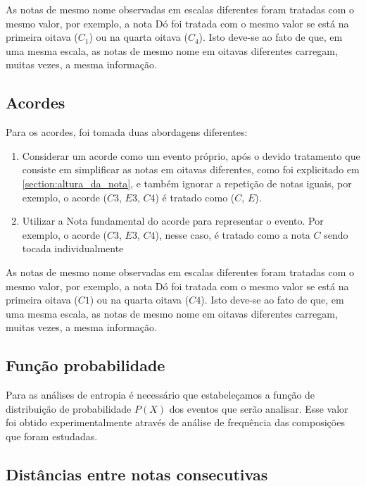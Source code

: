 As notas de mesmo nome observadas em escalas diferentes foram tratadas com o mesmo valor, por exemplo, a nota Dó foi tratada com o mesmo valor se está na primeira oitava ($C_1$) ou na quarta oitava ($C_4$). Isto deve-se ao fato de que, em uma mesma escala, as notas de mesmo nome em oitavas diferentes carregam, muitas vezes, a mesma informação.

\subsection{Acordes}

Para os acordes, foi tomada duas abordagens diferentes:

\begin{enumerate}
    \item Considerar um acorde como um evento próprio, após o devido tratamento que consiste em simplificar as notas em oitavas diferentes, como foi explicitado em \ref{section:altura_da_nota}, e também ignorar a repetição de notas iguais, por exemplo, o acorde ($C3$, $E3$, $C4$) é tratado como ($C$, $E$).

    \item Utilizar a Nota fundamental do acorde para representar o evento. Por exemplo, o acorde ($C3$, $E3$, $C4$), nesse caso, é tratado como a nota $C$ sendo tocada individualmente
\end{enumerate}

As notas de mesmo nome observadas em escalas diferentes foram tratadas com o mesmo valor, por exemplo, a nota Dó foi tratada com o mesmo valor se está na primeira oitava ($C1$) ou na quarta oitava ($C4$). Isto deve-se ao fato de que, em uma mesma escala, as notas de mesmo nome em oitavas diferentes carregam, muitas vezes, a mesma informação.

\subsection{Função probabilidade}

Para as análises de entropia é necessário que estabeleçamos a função de distribuição de probabilidade $P(X)$ dos eventos que serão analisar. Esse valor foi obtido experimentalmente através de análise de frequência das composições que foram estudadas.

\subsection{Distâncias entre notas consecutivas}

